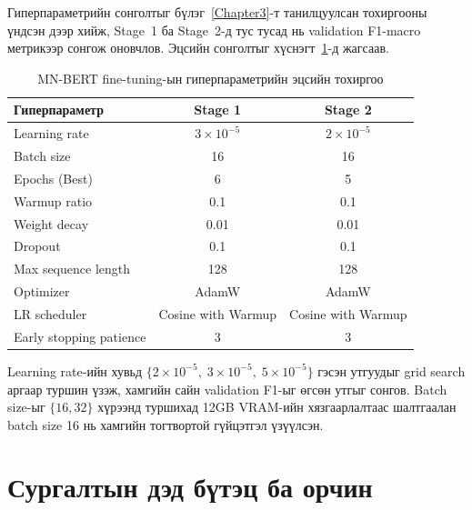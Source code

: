 Гиперпараметрийн сонголтыг бүлэг~\ref{Chapter3}-т танилцуулсан тохиргооны
үндсэн дээр хийж, Stage~1 ба Stage~2-д тус тусад нь validation F1-macro
метрикээр сонгож оновчлов. Эцсийн сонголтыг хүснэгт~\ref{tab:hyperparams-mnbert}-д
жагсаав.

\begin{table}[H]
\centering
\caption{MN-BERT fine-tuning-ын гиперпараметрийн эцсийн тохиргоо}
\label{tab:hyperparams-mnbert}
\begin{tabular}{@{}lcc@{}}
\toprule
\textbf{Гиперпараметр} & \textbf{Stage 1} & \textbf{Stage 2} \\
\midrule
Learning rate              & $3 \times 10^{-5}$ & $2 \times 10^{-5}$ \\
Batch size                 & 16                 & 16                 \\
Epochs (Best)              & 6                  & 5                  \\
Warmup ratio               & 0.1                & 0.1                \\
Weight decay               & 0.01               & 0.01               \\
Dropout                    & 0.1                & 0.1                \\
Max sequence length        & 128                & 128                \\
Optimizer                  & AdamW              & AdamW              \\
LR scheduler               & Cosine with Warmup & Cosine with Warmup \\
Early stopping patience    & 3                  & 3                  \\
\bottomrule
\end{tabular}
\end{table}

Learning rate-ийн хувьд $\{2\!\times\!10^{-5},\; 3\!\times\!10^{-5},\; 5\!\times\!10^{-5}\}$
гэсэн утгуудыг grid search аргаар туршин үзэж, хамгийн сайн validation F1-ыг
өгсөн утгыг сонгов. Batch size-ыг $\{16, 32\}$ хүрээнд туршихад 12GB VRAM-ийн
хязгаарлалтаас шалтгаалан batch size 16 нь хамгийн тогтвортой гүйцэтгэл үзүүлсэн.

\section{Сургалтын дэд бүтэц ба орчин}

